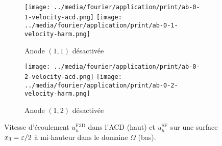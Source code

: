 \begin{figure}
  \begin{center}
    \begin{subfigure}[t]{\textwidth}
      \begin{center}
        \texttt{[image: ../media/fourier/application/print/ab-0-1-velocity-acd.png]}
        \texttt{[image: ../media/fourier/application/print/ab-0-1-velocity-harm.png]}
        \caption{Anode $(1,1)$ désactivée}
        \label{fig:}
      \end{center}
    \end{subfigure}

    \begin{subfigure}[t]{\textwidth}
      \begin{center}
        \texttt{[image: ../media/fourier/application/print/ab-0-2-velocity-acd.png]}
        \texttt{[image: ../media/fourier/application/print/ab-0-2-velocity-harm.png]}
        \caption{Anode $(1,2)$ désactivée}
        \label{fig:}
      \end{center}
    \end{subfigure}


    \caption{Vitesse d'écoulement $u_h^\mathrm{F3D}$ dans l'ACD (haut) et $u_h^\mathrm{SF}$ sur une surface
      $x_3 = \varepsilon / 2$ à mi-hauteur dans le domaine $\Omega$ (bas).}
    \label{fig:harmonic-velocity-comp}
  \end{center}
\end{figure}


